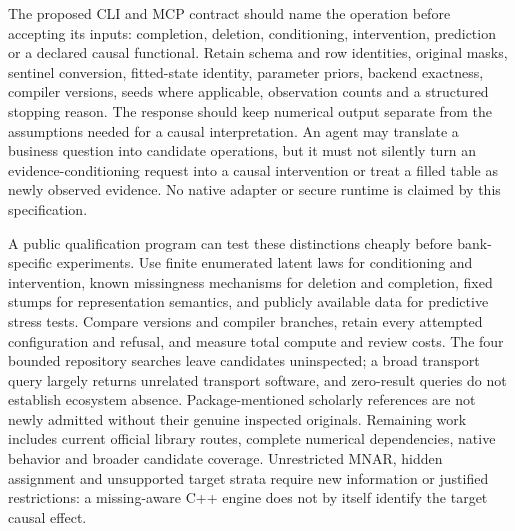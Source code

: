 The proposed CLI and MCP contract should name the operation before accepting its inputs: completion, deletion, conditioning, intervention, prediction or a declared causal functional. Retain schema and row identities, original masks, sentinel conversion, fitted-state identity, parameter priors, backend exactness, compiler versions, seeds where applicable, observation counts and a structured stopping reason. The response should keep numerical output separate from the assumptions needed for a causal interpretation. An agent may translate a business question into candidate operations, but it must not silently turn an evidence-conditioning request into a causal intervention or treat a filled table as newly observed evidence. No native adapter or secure runtime is claimed by this specification.~\citep{exec25_ctm_choice}

A public qualification program can test these distinctions cheaply before bank-specific experiments. Use finite enumerated latent laws for conditioning and intervention, known missingness mechanisms for deletion and completion, fixed stumps for representation semantics, and publicly available data for predictive stress tests. Compare versions and compiler branches, retain every attempted configuration and refusal, and measure total compute and review costs. The four bounded repository searches leave candidates uninspected; a broad transport query largely returns unrelated transport software, and zero-result queries do not establish ecosystem absence. Package-mentioned scholarly references are not newly admitted without their genuine inspected originals. Remaining work includes current official library routes, complete numerical dependencies, native behavior and broader candidate coverage. Unrestricted MNAR, hidden assignment and unsupported target strata require new information or justified restrictions: a missing-aware C++ engine does not by itself identify the target causal effect.~\citep{exec25_ctm_choice}
